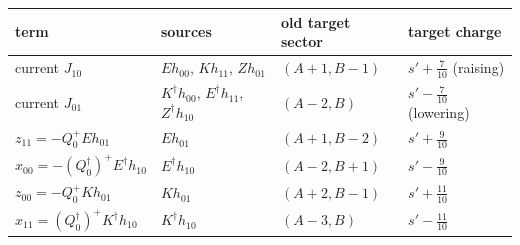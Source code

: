 \documentclass[11pt]{article}
\newcommand{\sn}{s'}
\theoremstyle{plain}
\theoremstyle{remark}
\numberwithin{equation}{section}
\begin{document}
\begin{center}\small
\begin{tabular}{llll}
\toprule
term & sources & old target sector & target charge\\
\midrule
current $J_{10}$ & $Eh_{00}$, $Kh_{11}$, $Zh_{01}$ & $(A+1,B-1)$ & $\sn+\tfrac7{10}$ (raising)\\
current $J_{01}$ & $K^\dagger h_{00}$, $E^\dagger h_{11}$, $Z^\dagger h_{10}$ & $(A-2,B)$ & $\sn-\tfrac7{10}$ (lowering)\\
$z_{11}=-Q_0^+Eh_{01}$ & $Eh_{01}$ & $(A+1,B-2)$ & $\sn+\tfrac9{10}$\\
$x_{00}=-(Q_0^\dagger)^+E^\dagger h_{10}$ & $E^\dagger h_{10}$ & $(A-2,B+1)$ & $\sn-\tfrac9{10}$\\
$z_{00}=-Q_0^+Kh_{01}$ & $Kh_{01}$ & $(A+2,B-1)$ & $\sn+\tfrac{11}{10}$\\
$x_{11}=(Q_0^\dagger)^+K^\dagger h_{10}$ & $K^\dagger h_{10}$ & $(A-3,B)$ & $\sn-\tfrac{11}{10}$\\
\bottomrule
\end{tabular}
\end{center}
\end{document}
